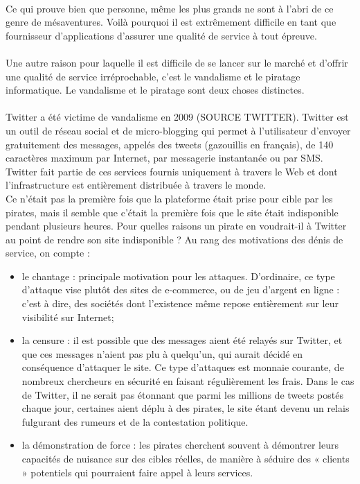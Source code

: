\documentclass[a4paper,12pt]{report}
\begin{document}
\begin{onehalfspace}
	\paragraph*{}
	Ce qui prouve bien que personne, même les plus grands ne sont à l'abri de ce genre de mésaventures. Voilà pourquoi il est extrêmement difficile en tant que fournisseur d'applications d'assurer une qualité de service à tout épreuve.

	\paragraph*{}
	Une autre raison pour laquelle il est difficile de se lancer sur le marché et d'offrir une
qualité de service irréprochable, c'est le vandalisme et le piratage informatique. Le vandalisme et le piratage sont deux choses distinctes. 

	\paragraph*{}
	Twitter a été victime de vandalisme en 2009 (SOURCE TWITTER). Twitter est un outil de réseau social et de micro-blogging qui permet à l'utilisateur d'envoyer gratuitement des messages, appelés des tweets (gazouillis en français), de 140 caractères maximum par Internet, par messagerie instantanée ou par SMS. Twitter fait partie de ces services fournis uniquement à travers le
Web et dont l'infrastructure est entièrement distribuée à travers le monde.\\

Ce n'était pas la première fois que la plateforme était prise pour cible par les pirates, mais il semble que c'était la première fois que le site était indisponible pendant plusieurs heures. Pour quelles raisons un pirate en voudrait-il à Twitter au point de rendre son site
indisponible ? Au rang des motivations des dénis de service, on compte :

	\begin{itemize}
		\item le chantage : principale motivation pour les attaques. D'ordinaire, ce type d'attaque vise plutôt des sites de e-commerce, ou de jeu d'argent en ligne : c'est à dire, des sociétés dont l'existence même repose entièrement sur leur visibilité sur Internet;
		\item la censure : il est possible que des messages aient été relayés sur Twitter, et que ces
messages n'aient pas plu à quelqu'un, qui aurait décidé en conséquence d'attaquer le site. Ce type d'attaques est monnaie courante, de nombreux chercheurs en sécurité en faisant régulièrement les frais. Dans le cas de Twitter, il ne serait pas étonnant que parmi les millions de tweets postés chaque jour, certaines aient déplu à des pirates, le site étant devenu un relais fulgurant des rumeurs et de la contestation politique.
		\item la démonstration de force : les pirates cherchent souvent à démontrer leurs capacités
de nuisance sur des cibles réelles, de manière à séduire des « clients » potentiels qui pourraient faire appel à leurs services.
	\end{itemize}


\end{onehalfspace}
\end{document}
